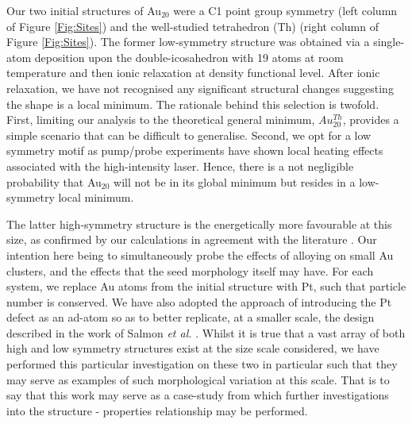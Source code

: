 Our two initial structures of Au$_{20}$ were a C1 point group symmetry (left column of Figure \ref{Fig:Sites}) and the well-studied tetrahedron (Th) (right column of Figure \ref{Fig:Sites}). The former low-symmetry structure was obtained via a single-atom deposition upon the double-icosahedron with 19 atoms at room temperature and then ionic relaxation at density functional level. After ionic relaxation, we have not recognised any significant structural changes suggesting the shape is a local minimum. The rationale behind this selection is twofold. First, limiting our analysis to the theoretical general minimum, $Au^{Th}_{20}$, provides a simple scenario that can be difficult to generalise. Second, we opt for a low symmetry motif as pump/probe experiments have shown local heating effects associated with the high-intensity laser. Hence, there is a not negligible probability that Au$_{20}$ will not be in its global minimum but resides in a low-symmetry local minimum.

The latter high-symmetry structure is the energetically more favourable at this size, as confirmed by our calculations in agreement with the literature \cite{Rapacioli2018,Gruene2008}. Our intention here being to simultaneously probe the effects of alloying on small Au clusters, and the effects that the seed morphology itself may have. For each system, we replace Au atoms from the initial structure with Pt, such that particle number is conserved. We have also adopted the approach of introducing the Pt defect as an ad-atom so as to better replicate, at a smaller scale, the design described in the work of Salmon \textit{et al.} \cite{JorgeStructure}. 
Whilst it is true that a vast array of both high and low symmetry structures exist at the size scale considered, we have performed this particular investigation on these two in particular such that they may serve as examples of such morphological variation at this scale. That is to say that this work may serve as a case-study from which further investigations into the structure - properties relationship may be performed.

